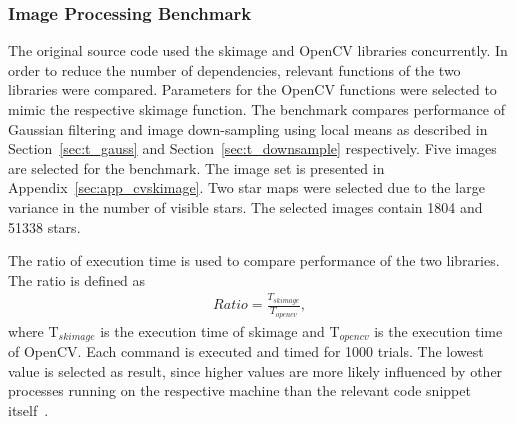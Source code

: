 \begin{table}[htb]
    \centering
    \caption{Summary of two profiles obtained while executing complete trials of \gls{sispo}, i.e. rendering, compression and reconstruction. More than \SI{90}{\percent} of total time is spent rendering images.}
    \label{tab:profiles}
\end{table}

\subsubsection{Image Processing Benchmark} \label{sec:cvskimage}
The original source code used the \gls{skimage} and OpenCV libraries concurrently. In order to reduce the number of dependencies, relevant functions of the two libraries were compared. Parameters for the OpenCV functions were selected to mimic the respective \gls{skimage} function. The benchmark compares performance of Gaussian filtering and image down-sampling using local means as described in Section~\ref{sec:t_gauss} and Section~\ref{sec:t_downsample} respectively. Five images are selected for the benchmark. The image set is presented in Appendix~\ref{sec:app_cvskimage}. Two star maps were selected due to the large variance in the number of visible stars. The selected images contain 1804 and 51338 stars.

The ratio of execution time is used to compare performance of the two libraries. The ratio is defined as
\begin{align}
    Ratio = \frac{T_{skimage}}{T_{opencv}}, \label{eq:bm_exec_ratio}
\end{align}
where \gls{T}$_{skimage}$ is the execution time of \gls{skimage} and \gls{T}$_{opencv}$ is the execution time of OpenCV. Each command is executed and timed for 1000 trials. The lowest value is selected as result, since higher values are more likely influenced by other processes running on the respective machine than the relevant code snippet itself~\cite{timeit2020}.

